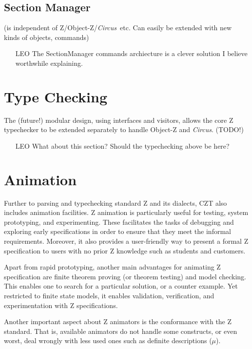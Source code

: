 \documentclass{llncs}
\newcommand{\Circus}{{\sf\slshape Circus}}
\begin{document}
\subsection{Section Manager}

  (is independent of Z/Object-Z/\Circus\ etc.
  Can easily be extended with new kinds of objects, commands)

    \begin{itemize}
        \item[LEO] The SectionManager commands archiecture is a clever solution I believe worthwhile explaining.
    \end{itemize}

\section{Type Checking}

      The (future!) modular design, using interfaces and visitors,
      allows the core Z typechecker to be extended separately
      to handle Object-Z and \Circus.  (TODO!)

    \begin{itemize}
        \item[LEO] What about this section? Should the typechecking above be here?
    \end{itemize}

\section{Animation}

    Further to parsing and typechecking standard Z and its dialects, CZT also includes
    animation facilities. Z animation is particularly useful for testing, system prototyping,
    and experimenting. These facilitates the tasks of debugging and exploring early
    specifications in order to ensure that they meet the informal requirements.
    Moreover, it also provides a user-friendly way to present a formal Z specification
    to users with no prior Z knowledge such as students and customers.

    Apart from rapid prototyping, another main advantages for animating Z specification
    are finite theorem proving (or theorem testing) and model checking.
    This enables one to search for a particular solution, or a counter example.
    Yet restricted to finite state models, it enables validation, verification, and
    experimentation with Z specifications.

    Another important aspect about Z animators is the conformance with the Z standard.
    That is, available animators do not handle some constructs, or even worst, deal
    wrongly with less used ones such as definite descriptions ($\mu$).
\end{document}
